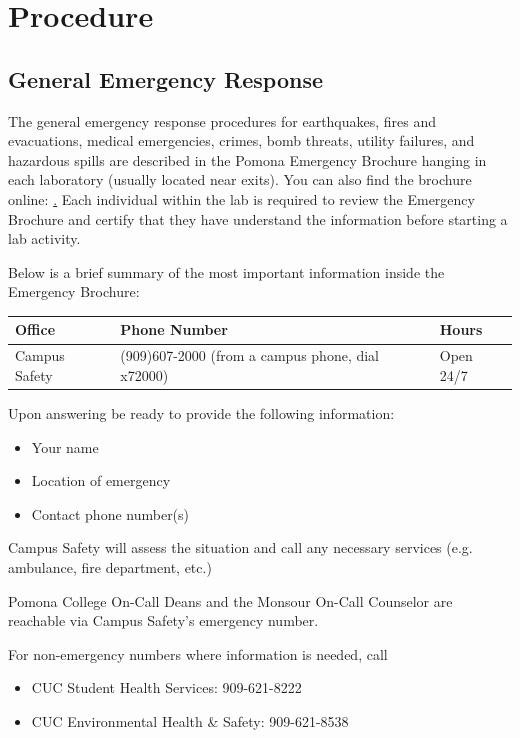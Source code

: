 \documentclass[12pt]{../SOP3_beta}
\begin{document}
\section{Procedure}

\subsection*{General Emergency Response}

\NP The general emergency response procedures for earthquakes, fires and evacuations, medical emergencies, crimes, bomb threats, utility failures, and hazardous spills are described in the Pomona Emergency Brochure hanging in each laboratory (usually located near exits). You can also find the brochure online: \href{http://www.pomona.edu/sites/default/files/emergency-instructions.pdf}. Each individual within the lab is required to review the Emergency Brochure and certify that they have understand the information before starting a lab activity.

\NP Below is a brief summary of the most important information inside the Emergency Brochure: 

\begin{table}
\begin{tabular}{lll} \hline
Office            & Phone Number & Hours \\ \hline\hline
Campus Safety     & (909)607-2000 (from a campus phone, dial x72000) & Open 24/7 \\ \hline
\end{tabular}
\end{table}

\NP Upon answering be ready to provide the following information:

\begin{itemize}
  \item Your name
  \item Location of emergency
  \item Contact phone number(s)
\end{itemize}

\NP Campus Safety will assess the situation and call any necessary services (e.g. ambulance, fire department, etc.)

\NP Pomona College On-Call Deans and the Monsour On-Call Counselor are reachable via Campus Safety's emergency number. 

\NP For non-emergency numbers where information is needed, call 
 
\begin{itemize}
  \item CUC Student Health Services: 909-621-8222
  \item CUC Environmental Health \& Safety: 909-621-8538 
\end{itemize}
\end{document}
